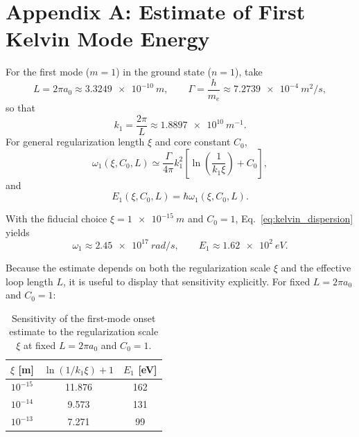 \documentclass[pdflatex,sn-mathphys-num]{sn-jnl}
\begin{document}
    \section*{Appendix A: Estimate of First Kelvin Mode Energy}\label{app:first_kelvin}
        For the first mode ($m=1$) in the ground state ($n=1$), take
        \begin{equation}
            L = 2\pi a_0 \approx \SI{3.3249e-10}{m},
            \qquad
            \Gamma = \frac{h}{m_e} \approx \SI{7.2739e-4}{m^2/s},
        \end{equation}
        so that
        \begin{equation}
            k_1 = \frac{2\pi}{L} \approx \SI{1.8897e10}{m^{-1}}.
        \end{equation}
        For general regularization length $\xi$ and core constant $C_0$,
        \begin{equation}
            \omega_1(\xi,C_0,L)
            \simeq
            \frac{\Gamma}{4\pi} k_1^2
            \left[
                \ln\!\left(\frac{1}{k_1 \xi}\right) + C_0
            \right],
        \end{equation}
        and
        \begin{equation}
            E_1(\xi,C_0,L)=\hbar \omega_1(\xi,C_0,L).
        \end{equation}

        With the fiducial choice $\xi=\SI{1e-15}{m}$ and $C_0=1$, Eq.~\eqref{eq:kelvin_dispersion} yields
        \begin{equation}
            \omega_1 \approx \SI{2.45e17}{rad/s},
            \qquad
            E_1 \approx \SI{1.62e2}{eV}.
        \end{equation}

        Because the estimate depends on both the regularization scale $\xi$ and the effective loop length $L$, it is useful to display that sensitivity explicitly. For fixed $L=2\pi a_0$ and $C_0=1$:
        \begin{table}[htbp]
            \centering
            \caption{Sensitivity of the first-mode onset estimate to the regularization scale $\xi$ at fixed $L=2\pi a_0$ and $C_0=1$.}
            \begin{tabular}{ccc}
                \toprule
                $\xi$ [m] & $\ln(1/k_1\xi)+1$ & $E_1$ [eV] \\
                \midrule
                $10^{-15}$ & 11.876 & 162 \\
                $10^{-14}$ & 9.573  & 131 \\
                $10^{-13}$ & 7.271  & 99  \\
                \bottomrule
            \end{tabular}
            \label{tab:xi-sensitivity}
        \end{table}
\end{document}

